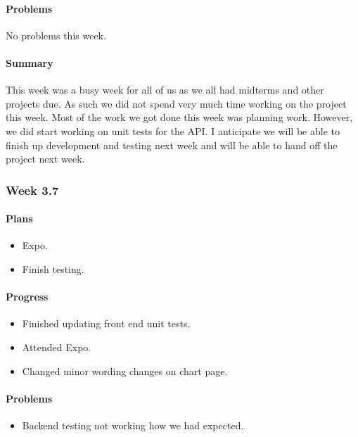 \documentclass[onecolumn, draftclsnofoot,10pt, compsoc]{article}
\begin{document}
		    \paragraph{Problems} \hfill \break
		            No problems this week.\\
		    \paragraph{Summary} \hfill \break
		    This week was a busy week for all of us as we all had midterms and other projects due. As such we did not spend very much time working on the project this week. Most of the work we got done this week was planning work. However, we did start working on unit tests for the API. I anticipate we will be able to finish up development and testing next week and will be able to hand off the project next week.\\
		\subsubsection{Week 3.7}
		    \paragraph{Plans} \hfill \break
		        \begin{itemize}
		            \item Expo.\\
		            \item Finish testing.\\
		        \end{itemize}
		    \paragraph{Progress} \hfill \break
		        \begin{itemize}
		            \item Finished updating front end unit tests.\\
		            \item Attended Expo.\\
		            \item Changed minor wording changes on chart page.\\
		        \end{itemize}
		    \paragraph{Problems} \hfill \break
		        \begin{itemize}
		            \item Backend testing not working how we had expected.\\
		        \end{itemize}
\end{document}
